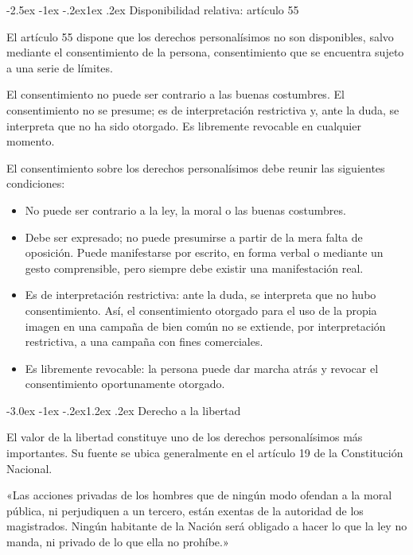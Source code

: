 \documentclass[12pt,oneside]{book}
\makeatletter
\renewcommand\section{\@startsection{section}{1}{\z@}%
  {-3.0ex \@plus -1ex \@minus -.2ex}{1.2ex \@plus .2ex}%
  {\normalfont\large\bfseries\color{acento}}}
\renewcommand\subsection{\@startsection{subsection}{2}{\z@}%
  {-2.5ex \@plus -1ex \@minus -.2ex}{1ex \@plus .2ex}%
  {\normalfont\normalsize\bfseries}}
\makeatother
\begin{document}
\subsection{Disponibilidad relativa: artículo 55}

El artículo 55 dispone que los derechos personalísimos no son disponibles, salvo mediante el consentimiento de la persona, consentimiento que se encuentra sujeto a una serie de límites.

\begin{regla}
El consentimiento no puede ser contrario a las buenas costumbres. El consentimiento no se presume; es de interpretación restrictiva y, ante la duda, se interpreta que no ha sido otorgado. Es libremente revocable en cualquier momento.
\end{regla}

\begin{importante}
El consentimiento sobre los derechos personalísimos debe reunir las siguientes condiciones:
\begin{itemize}
    \item No puede ser contrario a la ley, la moral o las buenas costumbres.
    \item Debe ser expresado; no puede presumirse a partir de la mera falta de oposición. Puede manifestarse por escrito, en forma verbal o mediante un gesto comprensible, pero siempre debe existir una manifestación real.
    \item Es de interpretación restrictiva: ante la duda, se interpreta que no hubo consentimiento. Así, el consentimiento otorgado para el uso de la propia imagen en una campaña de bien común no se extiende, por interpretación restrictiva, a una campaña con fines comerciales.
    \item Es libremente revocable: la persona puede dar marcha atrás y revocar el consentimiento oportunamente otorgado.
\end{itemize}
\end{importante}

\section{Derecho a la libertad}

El valor de la libertad constituye uno de los derechos personalísimos más importantes. Su fuente se ubica generalmente en el artículo 19 de la Constitución Nacional.

\begin{regla}
«Las acciones privadas de los hombres que de ningún modo ofendan a la moral pública, ni perjudiquen a un tercero, están exentas de la autoridad de los magistrados. Ningún habitante de la Nación será obligado a hacer lo que la ley no manda, ni privado de lo que ella no prohíbe.»
\end{regla}
\end{document}
